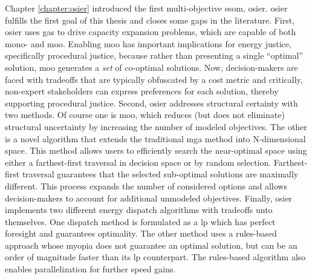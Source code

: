Chapter \ref{chapter:osier} introduced the first multi-objective \ac{esom},
\ac{osier}. \ac{osier} fulfills the first goal of this thesis and closes some
gaps in the literature. First, \ac{osier} uses \acfp{ga} to drive capacity
expansion problems, which are capable of both mono- and \acl{moo}. Enabling
\ac{moo} has important implications for energy justice, specifically procedural
justice, because rather than presenting a single ``optimal'' solution, \ac{moo}
generates a \textit{set} of co-optimal solutions. Now, decision-makers are faced
with tradeoffs that are typically obfuscated by a cost metric and critically,
non-expert stakeholders can express preferences for each solution, thereby
supporting procedural justice. Second, \ac{osier} addresses structural certainty
with two methods. Of course one is \ac{moo}, which reduces (but does not
eliminate) structural uncertainty by increasing the number of modeled
objectives. The other is a novel algorithm that extends the traditional \ac{mga}
method into N-dimensional space. This method allows users to efficiently search
the near-optimal space using either a farthest-first traversal in decision space
or by random selection. Farthest-first traversal guarantees that the selected
sub-optimal solutions are maximally different. This process expands the number
of considered options and allows decision-makers to account for additional
unmodeled objectives. Finally, \ac{osier} implements two different energy
dispatch algorithms with tradeoffs unto themselves. One dispatch method is
formulated as a \acf{lp} which has perfect foresight and guarantees optimality.
The other method uses a rules-based approach whose myopia does not guarantee an
optimal solution, but can be an order of magnitude faster than its \ac{lp}
counterpart. The rules-based algorithm also enables parallelization for further
speed gains.

